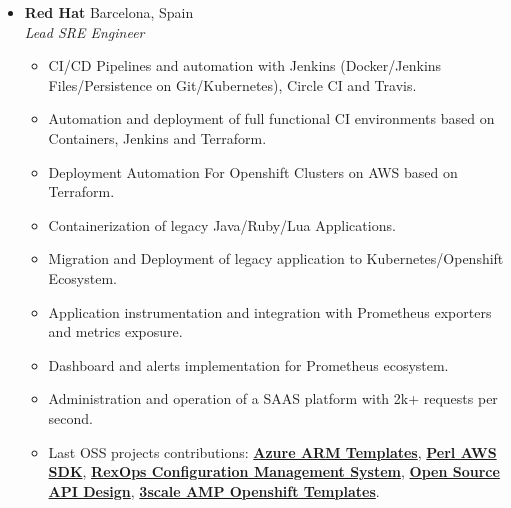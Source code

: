 \documentclass[]{friggeri-cv} %
\renewenvironment{entrylist}{%
  \begin{itemize}[leftmargin=1in]%
}{%
  \end{itemize}
}
\renewcommand{\entry}[4]{%
  \item[#1]
    \textbf{#2}%
    \hfill%
    {\footnotesize\addfontfeature{Color=lightgray} #3}\\%
    #4\vspace{\parsep}%
  }
\begin{document}
\begin{entrylist}
\entry
{2017--2019}
{Red Hat}
{Barcelona, Spain}
{\emph{Lead SRE Engineer} 
\begin{itemize}[label=\textbullet]
    \item CI/CD Pipelines and automation with Jenkins (Docker/Jenkins Files/Persistence on Git/Kubernetes), Circle CI and Travis.
    \item Automation and deployment of full functional CI environments based on Containers, Jenkins and Terraform.
    \item Deployment Automation For Openshift Clusters on AWS based on Terraform.
    \item Containerization of legacy Java/Ruby/Lua Applications.
    \item Migration and Deployment of legacy application to Kubernetes/Openshift Ecosystem.
    \item Application instrumentation and integration with Prometheus exporters and metrics exposure.
    \item Dashboard and alerts implementation for Prometheus ecosystem.
    \item Administration and operation of a SAAS platform with 2k+ requests per second.
    \item Last OSS projects contributions: \href{https://github.com/Azure/azure-quickstart-templates}{\textbf{Azure ARM Templates}}, \href{https://github.com/pplu/aws-sdk-perl}{\textbf{Perl AWS SDK}}, \href{https://github.com/RexOps/Rex}{\textbf{RexOps Configuration Management System}}, \href{https://github.com/Apicurio/apicurio-studio}{\textbf{Open Source API Design}}, \href{https://github.com/3scale/3scale-amp-openshift-templates}{\textbf{3scale AMP Openshift Templates}}.
\end{itemize}}


\end{entrylist}
\end{document}
